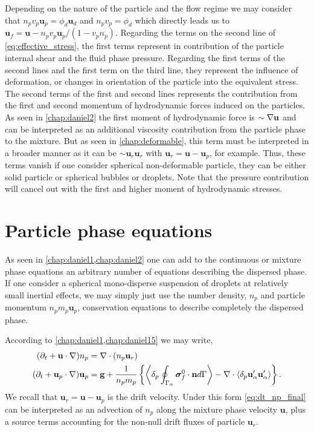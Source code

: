 Depending on the nature of the particle and the flow regime we may consider that $n_pv_p\textbf{u}_p = \phi_d \textbf{u}_d$ and $n_pv_p = \phi_d$ which directly leads us to $\textbf{u}_f = \textbf{u}- n_pv_p \textbf{u}_p / (1 - v_pn_p)$. 
Regarding the terms on the second line of \ref{eq:effective_stress}, the first terms represent in contribution of the particle internal shear and the fluid phase pressure.
Regarding the first terms of the second lines and the first term on the third line, they represent the influence of deformation, or changes in orientation of the particle into the equivalent stress. 
The second terms of the first and second lines represents the contribution from the first and second momentum of hydrodynamic forces induced on the particles. 
As seen in \ref{chap:daniel2} the first moment of hydrodynamic force is $\sim \mathbf{\nabla} \textbf{u}$ and can be interpreted as an additional viscosity contribution from the particle phase to the mixture. 
But as seen in \ref{chap:deformable}, this term must be interpreted in a broader manner as it can be $\sim \textbf{u}_r \textbf{u}_r$ with $\textbf{u}_r = \textbf{u}- \textbf{u}_p$, for example.
Thus, these terms vanish if one consider spherical non-deformable particle, they can be either solid particle or spherical bubbles or droplets. 
Note that the pressure contribution will cancel out with the first and higher moment of hydrodynamic stresses. 


\section{Particle phase equations}

As seen in \ref{chap:daniel1,chap:daniel2} one can add to the continuous or mixture phase equations an arbitrary number of equations describing the dispersed phase. 
If one consider a spherical mono-disperse suspension of droplets at relatively small inertial effects, we may simply just use the number density, $n_p$ and particle momentum $n_pm_p \textbf{u}_p$, conservation equations to describe completely the dispersed phase. 

According to \ref{chap:daniel1,chap:daniel15} we may write, 
\begin{align}
    (\pddt  
    + \textbf{u} \cdot\grad )n_p
    &= 
    \div (n_p\textbf{u}_r)
    \label{eq:dt_np_final}
    \\
    (\pddt + \textbf{u}_p \cdot \grad)  \textbf{u}_p
    &= 
    \textbf{g}
    + \frac{1}{n_pm_p}\left\{
        \pSavg{\bm\sigma_f^0 \cdot \textbf{n}}
        - \div \pavg{\textbf{u}_\alpha'\textbf{u}_\alpha'}
    \right\}.
    \label{eq:dt_up_final}
\end{align}
We recall that $\textbf{u}_r = \textbf{u} - \textbf{u}_p$ is the drift velocity. 
Under this form \ref{eq:dt_np_final} can be interpreted as an advection of $n_p$ along the mixture phase velocity $\textbf{u}$, plus a source terms accounting for the non-null drift fluxes of particle $\textbf{u}_r$. 


